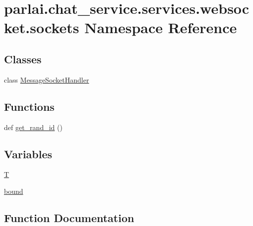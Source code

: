 \hypertarget{namespaceparlai_1_1chat__service_1_1services_1_1websocket_1_1sockets}{}\section{parlai.\+chat\+\_\+service.\+services.\+websocket.\+sockets Namespace Reference}
\label{namespaceparlai_1_1chat__service_1_1services_1_1websocket_1_1sockets}
\subsection*{Classes}
\begin{DoxyCompactItemize}
\item 
class \hyperlink{classparlai_1_1chat__service_1_1services_1_1websocket_1_1sockets_1_1MessageSocketHandler}{Message\+Socket\+Handler}
\end{DoxyCompactItemize}
\subsection*{Functions}
\begin{DoxyCompactItemize}
\item 
def \hyperlink{namespaceparlai_1_1chat__service_1_1services_1_1websocket_1_1sockets_a474be2aef9361e19eacf308fbce1e802}{get\+\_\+rand\+\_\+id} ()
\end{DoxyCompactItemize}
\subsection*{Variables}
\begin{DoxyCompactItemize}
\item 
\hyperlink{namespaceparlai_1_1chat__service_1_1services_1_1websocket_1_1sockets_a263c27434f199b969889951a87aa7fc6}{T}
\item 
\hyperlink{namespaceparlai_1_1chat__service_1_1services_1_1websocket_1_1sockets_ad329c1d9832400cb79ca995c091d6ced}{bound}
\end{DoxyCompactItemize}


\subsection{Function Documentation}
\mbox{\label{namespaceparlai_1_1chat__service_1_1services_1_1websocket_1_1sockets_a474be2aef9361e19eacf308fbce1e802}} 
